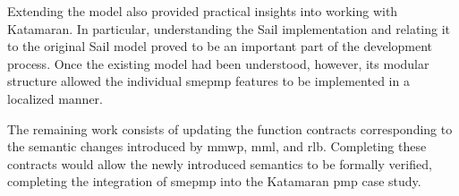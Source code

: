 Extending the model also provided practical insights into working with Katamaran.
In particular, understanding the \textmu{}Sail implementation and relating it to the original Sail model proved to be an important part of the development process.
Once the existing model had been understood, however, its modular structure allowed the individual \gls{smepmp} features to be implemented in a localized manner.

The remaining work consists of updating the function contracts corresponding to the semantic changes introduced by \gls{mmwp}, \gls{mml}, and \gls{rlb}.
Completing these contracts would allow the newly introduced semantics to be formally verified, completing the integration of \gls{smepmp} into the Katamaran \gls{pmp} case study.